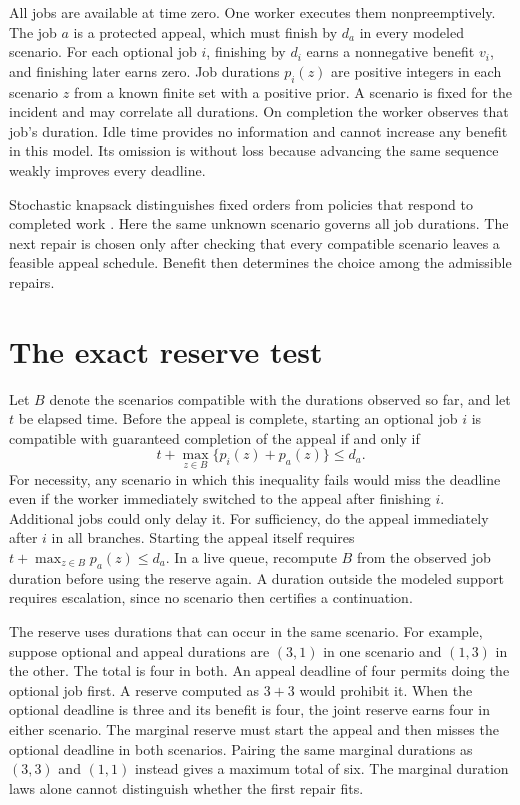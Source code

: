 \documentclass[11pt]{article}
\begin{document}
All jobs are available at time zero. One worker executes them
nonpreemptively. The job $a$ is a protected appeal, which must
finish by $d_a$ in every modeled scenario. For each optional job
$i$, finishing by $d_i$ earns a nonnegative benefit $v_i$, and
finishing later earns zero. Job durations $p_i(z)$ are positive
integers in each scenario $z$ from a known finite set with a
positive prior. A scenario is fixed for the incident and may
correlate all durations. On completion the worker observes that
job's duration. Idle time provides no information and cannot
increase any benefit in this model. Its omission is without loss
because advancing the same sequence weakly improves every deadline.

Stochastic knapsack distinguishes fixed orders from policies that
respond to completed work \cite{dean}. Here the same unknown
scenario governs all job durations. The next repair is chosen only
after checking that every compatible scenario leaves a feasible
appeal schedule. Benefit then determines the choice among the
admissible repairs.

\section{The exact reserve test}
Let $B$ denote the scenarios compatible with the durations observed
so far, and let $t$ be elapsed time. Before the appeal is complete,
starting an optional job $i$ is compatible with guaranteed completion
of the appeal if and only if
\[
t+\max_{z\in B}\{p_i(z)+p_a(z)\}\le d_a.
\]
For necessity, any scenario in which this inequality fails would
miss the deadline even if the worker immediately switched to the
appeal after finishing $i$. Additional jobs could only delay it.
For sufficiency, do the appeal immediately after $i$ in all branches.
Starting the appeal itself requires $t+\max_{z\in B}p_a(z)\le d_a$.
In a live queue, recompute $B$ from the observed job duration before
using the reserve again. A duration outside the modeled support
requires escalation, since no scenario then certifies a continuation.

The reserve uses durations that can occur in the same scenario.
For example, suppose optional and appeal durations are $(3,1)$
in one scenario and $(1,3)$ in the other. The total is four in
both. An appeal deadline of four permits doing the optional job
first. A reserve computed as $3+3$ would prohibit it.
When the optional deadline is three and its benefit is four,
the joint reserve earns four in either scenario. The marginal
reserve must start the appeal and then misses the optional deadline
in both scenarios. Pairing the same marginal durations as $(3,3)$
and $(1,1)$ instead gives a maximum total of six. The marginal
duration laws alone cannot distinguish whether the first repair
fits.
\end{document}
